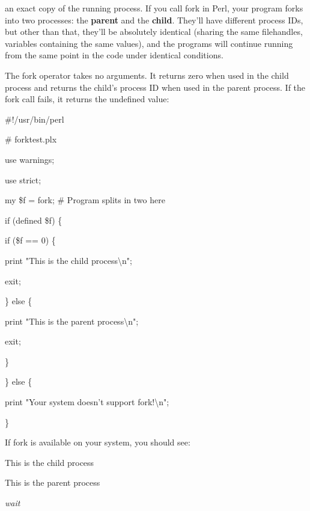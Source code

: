 \documentclass[a4paper,11pt]{book}
\begin{document}
\noindent an exact copy of the running process. If you call fork in Perl, your program forks into two processes: the \textbf{parent }and the \textbf{child}. They'll have different process IDs, but other than that, they'll be absolutely identical (sharing the same filehandles, variables containing the same values), and the programs will continue running from the same point in the code under identical conditions.

\noindent 

\noindent The fork operator takes no arguments. It returns zero when used in the child process and returns the child's process ID when used in the parent process. If the fork call fails, it returns the undefined value:

\noindent 

\noindent \#!/usr/bin/perl

\noindent \# forktest.plx

\noindent use warnings;

\noindent use strict;

\noindent my \$f = fork; \# Program splits in two here

\noindent if (defined \$f) \{

\noindent if (\$f == 0) \{

\noindent print "This is the child process\textbackslash n";

\noindent exit;

\noindent 

\noindent 

\noindent 

\noindent \} else \{

\noindent print "This is the parent process\textbackslash n";

\noindent exit;

\noindent \}

\noindent \} else \{

\noindent print "Your system doesn't support fork!\textbackslash n";

\noindent \}

\noindent 

\noindent If fork is available on your system, you should see:

\noindent 

\noindent This is the child process

\noindent This is the parent process

\noindent 

\noindent \textit{wait}
\end{document}
